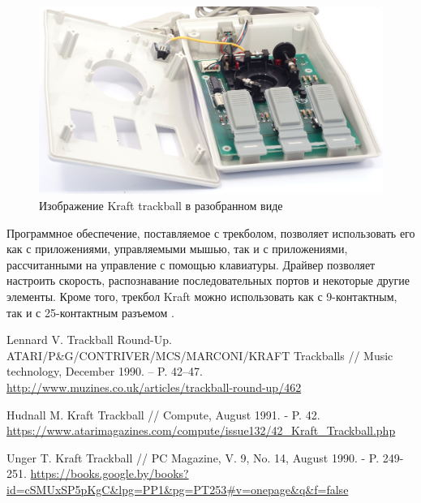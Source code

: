 \documentclass[11pt, a4paper]{article}
\begin{document}
\begin{figure}[h]
    \centering
    \includegraphics[scale=0.6]{1989_kraft_trackball/inside_30.jpg}
    \caption{Изображение Kraft trackball в разобранном виде}
    \label{fig:KraftInside}
\end{figure}

Программное обеспечение, поставляемое с трекболом, позволяет использовать его как с приложениями, управляемыми мышью, так и с приложениями, рассчитанными на управление с помощью клавиатуры. Драйвер позволяет настроить скорость, распознавание последовательных портов и некоторые другие элементы. Кроме того, трекбол Kraft можно использовать как с 9-контактным, так и с 25-контактным разъемом \cite{Hudnall}.

\begin{thebibliography}{9}
 Lennard V. Trackball Round-Up. ATARI/P\&G/CONTRIVER/MCS/MARCONI/KRAFT Trackballs // Music technology, December 1990. -- P. 42--47. \url{http://www.muzines.co.uk/articles/trackball-round-up/462}

 Hudnall M. Kraft Trackball // Compute, August 1991. - P. 42. \url{https://www.atarimagazines.com/compute/issue132/42_Kraft_Trackball.php}

 Unger T. Kraft Trackball // PC Magazine, V. 9, No. 14, August 1990. - P. 249-251. \url{https://books.google.by/books?id=cSMUxSP5pKgC&lpg=PP1&pg=PT253#v=onepage&q&f=false}
\end{thebibliography}
\end{document}
